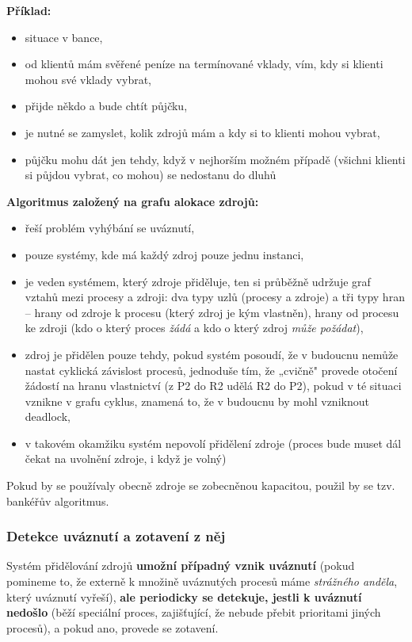 \documentclass[a4paper, 11pt]{article}
\begin{document}
\textbf{Příklad:}
\begin{itemize}
    \item situace v bance,
    \item od klientů mám svěřené peníze na termínované vklady, vím, kdy si klienti mohou své vklady vybrat,
    \item přijde někdo a bude chtít půjčku,
    \item je nutné se zamyslet, kolik zdrojů mám a kdy si to klienti mohou vybrat,
    \item půjčku mohu dát jen tehdy, když v nejhorším možném případě (všichni klienti si půjdou vybrat, co mohou) se nedostanu do dluhů
\end{itemize}

\textbf{Algoritmus založený na grafu alokace zdrojů:}
\begin{itemize}
    \item řeší problém vyhýbání se uváznutí,
    \item pouze systémy, kde má každý zdroj pouze jednu instanci,
    \item je veden systémem, který zdroje přiděluje, ten si průběžně udržuje graf vztahů mezi procesy a zdroji: dva typy uzlů (procesy a zdroje) a tři typy hran -- hrany od zdroje k procesu (který zdroj je kým vlastněn), hrany od procesu ke zdroji (kdo o který proces \emph{žádá} a kdo o který zdroj \emph{může požádat}),
    \item zdroj je přidělen pouze tehdy, pokud systém posoudí, že v budoucnu nemůže nastat cyklická závislost procesů, jednoduše tím, že „cvičně" provede otočení žádostí na hranu vlastnictví (z P2 do R2 udělá R2 do P2), pokud v té situaci vznikne v grafu cyklus, znamená to, že v budoucnu by mohl vzniknout deadlock,
    \item v takovém okamžiku systém nepovolí přidělení zdroje (proces bude muset dál čekat na uvolnění zdroje, i když je volný)
\end{itemize}
 
Pokud by se používaly obecně zdroje se zobecněnou kapacitou, použil by se tzv. bankéřův algoritmus.

\subsubsection{Detekce uváznutí a zotavení z něj}
Systém přidělování zdrojů \textbf{umožní případný vznik uváznutí} (pokud pomineme to, že externě k množině uváznutých procesů máme \textit{strážného anděla}, který uváznutí vyřeší), \textbf{ale periodicky se detekuje, jestli k uváznutí nedošlo} (běží speciální proces, zajišťující, že nebude přebit prioritami jiných procesů), a pokud ano, provede se zotavení.
 
\end{document}
